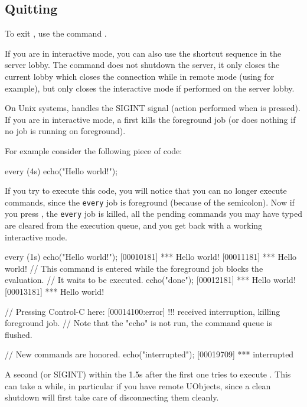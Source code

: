 \subsection{Quitting}
\label{sec:tools:urbi:quitting}

To exit , use the command .

If you are in interactive mode, you can also use the shortcut sequence
 in the server lobby. The command  does not
shutdown the server, it only closes the current lobby which closes the
connection while in remote mode (using  for example), but
only closes the interactive mode if performed on the server lobby.

On Unix systems,  handles the SIGINT signal (action performed
when  is pressed). If you are in interactive mode, a first
 kills the foreground job (or does nothing if no job is running on
foreground).

For example consider the following piece of code:

\begin{urbiunchecked}
every (4s)
  echo("Hello world!");
\end{urbiunchecked}

\noindent
If you try to execute this code, you will notice that you can no longer
execute commands, since the \lstinline{every} job is foreground (because of
the semicolon). Now if you press , the \lstinline{every} job is
killed, all the pending commands you may have typed are cleared from the
execution queue, and you get back with a working interactive mode.

\begin{urbiunchecked}
every (1s) echo("Hello world!");
[00010181] *** Hello world!
[00011181] *** Hello world!
// This command is entered while the foreground job blocks the evaluation.
// It waits to be executed.
echo("done");
[00012181] *** Hello world!
[00013181] *** Hello world!

// Pressing Control-C here:
[00014100:error] !!! received interruption, killing foreground job.
// Note that the "echo" is not run, the command queue is flushed.

// New commands are honored.
echo("interrupted");
[00019709] *** interrupted
\end{urbiunchecked}

A second  (or SIGINT) within the 1.5s after the first one tries to
execute .  This can take a while, in particular if
you have remote UObjects, since a clean shutdown will first take care of
disconnecting them cleanly.

